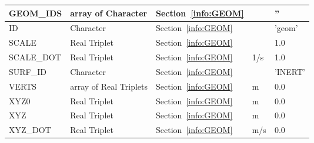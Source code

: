 \documentclass[12pt]{article}
\begin{document}
\begin{longtable}{@{\extracolsep{\fill}}|l|l|l|l|l|}
{\ct GEOM\_IDS}    & array of Character & Section~\ref{info:GEOM}                &           &   {\ct ''}               \\ \hline
{\ct ID}           & Character              & Section~\ref{info:GEOM}            &           &   {\ct 'geom'}           \\ \hline
{\ct SCALE}        & Real Triplet           & Section~\ref{info:GEOM}            &           &   1.0                    \\ \hline
{\ct SCALE\_DOT}   & Real Triplet           & Section~\ref{info:GEOM}            &  1/s      &   1.0                    \\ \hline
{\ct SURF\_ID}     & Character              & Section~\ref{info:GEOM}            &           &  {\ct 'INERT'}           \\ \hline
{\ct VERTS}        & array of Real Triplets & Section~\ref{info:GEOM}            &   m       &   0.0                    \\ \hline
{\ct XYZ0}         & Real Triplet           & Section~\ref{info:GEOM}            &   m       &   0.0                    \\ \hline
{\ct XYZ}          & Real Triplet           & Section~\ref{info:GEOM}            &   m       &   0.0                    \\ \hline
{\ct XYZ\_DOT}     & Real Triplet           & Section~\ref{info:GEOM}            &   m/s     &   0.0                    \\ \hline

\end{longtable}


\vspace{\baselineskip}
\end{document}
